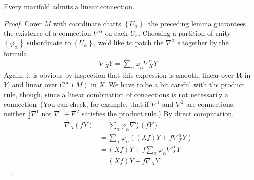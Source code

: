 \documentclass[12pt]{article} %
\begin{document}
\begin{lema}
Every manifold admits a linear connection.
\end{lema}
\begin{proof}
Cover $M$ with coordinate charts $\left\{U_{\alpha}\right\}$; the preceding lemma guarantees the existence of a connection $\nabla^{\alpha}$ on each $U_{\alpha}$. Choosing a partition of unity $\left\{\varphi_{\alpha}\right\}$ subordinate to $\left\{U_{\alpha}\right\}$, we'd like to patch the $\nabla^{\alpha}$ s together by the formula
\begin{align*}
\nabla_{X} Y=\sum_{\alpha} \varphi_{\alpha} \nabla_{X}^{\alpha} Y
\end{align*}
Again, it is obvious by inspection that this expression is smooth, linear over $\mathbf{R}$ in $Y$, and linear over $C^{\infty}(M)$ in $X$. We have to be a bit careful with the product rule, though, since a linear combination of connections is not necessarily a connection. (You can check, for example, that if $\nabla^{1}$ and $\nabla^{2}$
are connections, neither $\frac{1}{2} \nabla^{1}$ nor $\nabla^{1}+\nabla^{2}$ satisfies the product rule.) By direct computation,
\begin{align*}
\begin{aligned}
\nabla_{X}(f Y) &=\sum_{\alpha} \varphi_{\alpha} \nabla_{X}^{\alpha}(f Y) \\
&=\sum_{\alpha} \varphi_{\alpha}\left((X f) Y+f \nabla_{X}^{\alpha} Y\right) \\
&=(X f) Y+f \sum_{\alpha} \varphi_{\alpha} \nabla_{X}^{\alpha} Y \\
&=(X f) Y+f \nabla_{X} Y
\end{aligned}
\end{align*}
\end{proof}
\end{document}
